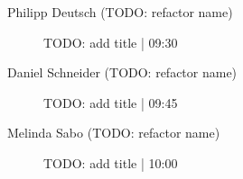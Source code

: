\begin{symposium}
\begin{description}
                \item [Philipp Deutsch (TODO: refactor name)] TODO: add title \textcolor{mygray}{ | 09:30}    
                
                \item [Daniel Schneider (TODO: refactor name)] TODO: add title \textcolor{mygray}{ | 09:45}    
                
                \item [Melinda Sabo (TODO: refactor name)] TODO: add title \textcolor{mygray}{ | 10:00}    
                
            \end{description} 
            \end{symposium}
            
